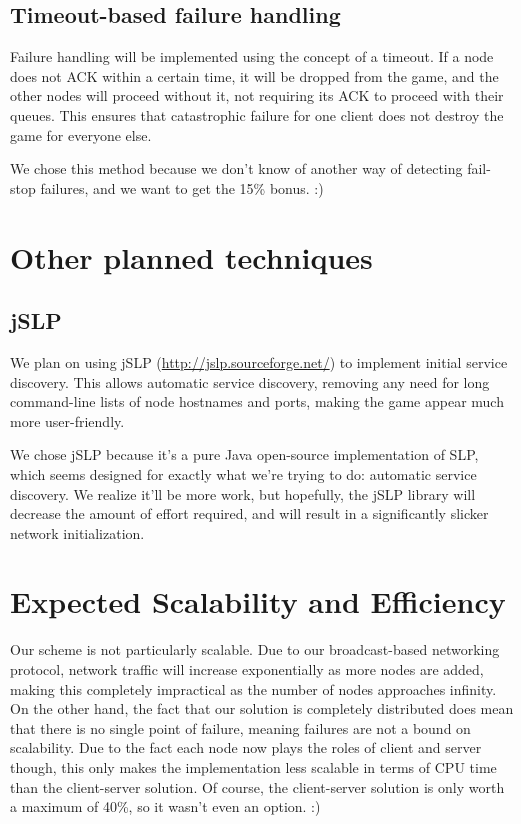 \documentclass[12pt]{article}
\begin{document}
\subsection{Timeout-based failure handling}

Failure handling will be implemented using the concept of a timeout.  If a node does not ACK within a certain time, it will be dropped from the game, and the other nodes will proceed without it, not requiring its ACK to proceed with their queues.  This ensures that catastrophic failure for one client does not destroy the game for everyone else.

We chose this method because we don't know of another way of detecting fail-stop failures, and we want to get the 15\% bonus.  :)

\section{Other planned techniques}

\subsection{jSLP}

We plan on using jSLP (\url{http://jslp.sourceforge.net/}) to implement initial service discovery.  This allows automatic service discovery, removing any need for long command-line lists of node hostnames and ports, making the game appear much more user-friendly.

We chose jSLP because it's a pure Java open-source implementation of SLP, which seems designed for exactly what we're trying to do: automatic service discovery.  We realize it'll be more work, but hopefully, the jSLP library will decrease the amount of effort required, and will result in a significantly slicker network initialization.

\section{Expected Scalability and Efficiency}

Our scheme is not particularly scalable.  Due to our broadcast-based networking protocol, network traffic will increase exponentially as more nodes are added, making this completely impractical as the number of nodes approaches infinity.  On the other hand, the fact that our solution is completely distributed does mean that there is no single point of failure, meaning failures are not a bound on scalability.  Due to the fact each node now plays the roles of client and server though, this only makes the implementation less scalable in terms of CPU time than the client-server solution.  Of course, the client-server solution is only worth a maximum of 40\%, so it wasn't even an option.  :)
\end{document}
